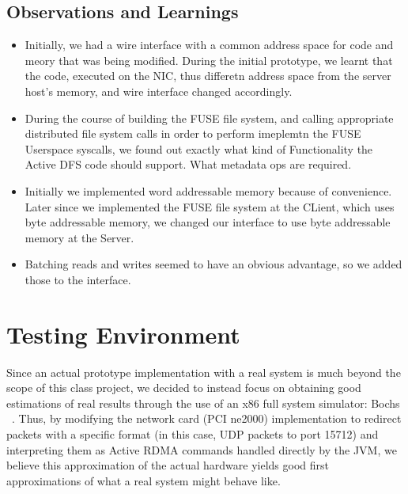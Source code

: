 \documentclass[10pt]{article}
\begin{document}
\subsection{Observations and Learnings}
\begin{itemize}
\item Initially, we had a wire interface with a common address space for code and meory that was being modified. During the initial prototype, we learnt that the code, executed on the NIC, thus 
differetn address space from the server host's memory, and wire interface changed accordingly.
\item During the course of building the FUSE file system, and calling appropriate distributed  file system calls in order to perform imeplemtn the FUSE Userspace syscalls, we found out exactly what kind of Functionality the Active DFS code should support. What metadata ops are required.
\item Initially we implemented word addressable memory because of convenience. Later since we implemented the FUSE file system at the CLient, which uses byte addressable memory, we changed our interface to use byte addressable memory at the Server.
\item Batching reads and writes seemed to have an obvious advantage, so we added those to the interface.

\end{itemize}

\section{Testing Environment}

Since an actual prototype implementation with a real system is much beyond the scope of this class project, we decided to instead focus on obtaining good estimations of real results through the use of an x86 full system simulator: Bochs ~\cite{bochs}. Thus, by modifying the network card (PCI ne2000) implementation to redirect packets with a specific format (in this case, UDP packets to port 15712) and interpreting them as Active RDMA commands handled directly by the JVM, we believe this approximation of the actual hardware yields good first approximations of what a real system might behave like.

%  
  
\end{document}
